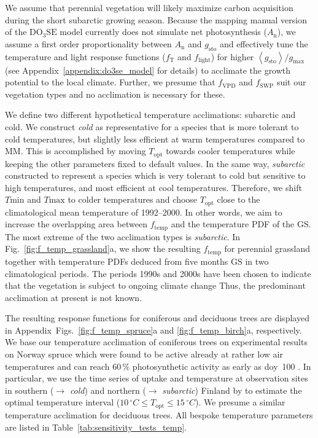 \documentclass[bg, manuscript]{copernicus}
\begin{document}
We assume that perennial vegetation will likely maximize carbon acquisition during the short subarctic growing season. Because the mapping manual version of the $\mathrm{DO_3SE}$ model currently does not simulate net photosynthesis ($A_\mathrm{n}$), we assume a first order proportionality between $A_\mathrm{n}$ and $g_\mathrm{sto}$ \citep{GCB:Medlyn2011} and effectively tune the temperature and light response functions ($f_\mathrm{T}$ and $f_\mathrm{light}$) for higher $\left<g_\mathrm{sto}\right>/g_\mathrm{max}$ (see Appendix~\ref{appendix:do3se_model} for details) to acclimate the growth potential to the local climate. Further, we presume that $f_\mathrm{VPD}$ and $f_\mathrm{SWP}$ suit our vegetation types and no acclimation is necessary for these. 

We define two different hypothetical temperature acclimations: subarctic and cold. We construct \emph{cold} as representative for a species that is more tolerant to cold temperatures, but slightly less efficient at warm temperatures compared to MM. This is accomplished by moving $T_\mathrm{opt}$ towards cooler temperatures while keeping the other parameters fixed to default values. In the same way, \emph{subarctic} constructed to represent a species which is very tolerant to cold but sensitive to high temperatures, and most efficient at cool temperatures. Therefore, we shift $T\mathrm{min}$ and $T\mathrm{max}$ to colder temperatures and choose $T_\mathrm{opt}$ close to the climatological mean temperature of 1992--2000. In other words, we aim to increase the overlapping area between $f_\mathrm{temp}$ and the temperature PDF of the GS. The most extreme of the two acclimation types is \emph{subarctic}.
In Fig.~\ref{fig:f_temp_grassland}a, we show the resulting $f_\mathrm{temp}$ for perennial grassland together with temperature PDFs deduced from five months GS in two climatological periods. The periods 1990s and 2000s have been chosen to indicate that the vegetation is subject to ongoing climate change Thus, the predominant acclimation at present is not known.

The resulting response functions for coniferous and deciduous trees are displayed in Appendix~Figs.~\ref{fig:f_temp_spruce}a and \ref{fig:f_temp_birch}a, respectively. We base our temperature acclimation of coniferous trees on experimental results on Norway spruce which were found to be active already at rather low air temperatures and can reach $60\,\unit{\%}$ photosynthetic activity as early as \unit{doy}~100 \citep{TB:Kolari2007, TP:Wallin2013}. In particular, we use the time series of  uptake and temperature at observation sites in southern ($\rightarrow$ \emph{cold}) and northern ($\rightarrow$ \emph{subarctic}) Finland by \citet{TB:Kolari2007} to estimate the optimal temperature interval ($10\,\unit{^\circ C}\le T_\mathrm{opt} \le 15\,\unit{^\circ C}$). We presume a similar temperature acclimation for deciduous trees. All bespoke temperature parameters are listed in Table~\ref{tab:sensitivity_tests_temp}.\\
\end{document}
